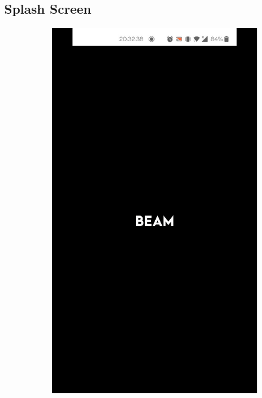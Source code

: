 \documentclass[../report.tex]{subfiles}
\begin{document}
\subsection{Splash Screen}
\begin{figure} [H]
	\centering
	\begin{subfigure}[b]{0.28\textwidth}
		\centering
		\includegraphics[width=\textwidth]{../images/07/02-app-splash.jpg}
		\label{fig:app-splash-1}
	\end{subfigure}

\end{figure}
\end{document}
